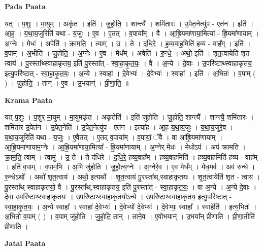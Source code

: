 \documentclass[17pt]{extarticle}
\begin{document}
\textbf{Pada Paata} \newline

यत् । प॒शुः । मा॒युम् । अकृ॑त । इति॑ । जु॒हो॒ति॒ । शान्त्यै᳚ । शमि॑तारः । उ॒पेत॒नेत्यु॑प - एत॑न । इति॑ । आ॒ह॒ । य॒था॒य॒जुरिति॑ यथा - य॒जुः । ए॒व । ए॒तत् । व॒पाया᳚म् । वै । आ॒ह्रि॒यमा॑णाया॒मित्या᳚ - ह्रि॒यमा॑णायाम् । अ॒ग्नेः । मेधः॑ । अपेति॑ । क्रा॒म॒ति॒ । त्वाम् । उ॒ । ते । द॒धि॒रे॒ । ह॒व्य॒वाह॒मिति॑ हव्य - वाह᳚म् । इति॑ । व॒पाम् । अ॒भीति॑ । जु॒हो॒ति॒ । अ॒ग्नेः । ए॒व । मेध᳚म् । अवेति॑ । रु॒न्धे॒ । अथो॒ इति॑ । शृ॒त॒त्वायेति॑ शृत - त्वाय॑ । पु॒रस्ता᳚थ्स्वाहाकृतय॒ इति॑ पु॒रस्ता᳚त् - स्वा॒हा॒कृ॒त॒यः॒ । वै । अ॒न्ये । दे॒वाः । उ॒परि॑ष्टाथ्स्वाहाकृतय॒ इत्यु॒परि॑ष्टात् - स्वा॒हा॒कृ॒त॒यः॒ । अ॒न्ये । स्वाहा᳚ । दे॒वेभ्यः॑ । दे॒वेभ्यः॑ । स्वाहा᳚ । इति॑ । अ॒भितः॑ । व॒पाम् ( ) । जु॒हो॒ति॒ । तान् । ए॒व । उ॒भयान्॑ । प्री॒णा॒ति॒ ॥  \newline


\textbf{Krama Paata} \newline

यत् प॒शुः । प॒शुर् मा॒युम् । मा॒युमकृ॑त । अकृ॒तेति॑ । इति॑ जुहोति । जु॒हो॒ति॒ शान्त्यै᳚ । शान्त्यै॒ शमि॑तारः । शमि॑तार उ॒पेत॑न । उ॒पेत॒नेति॑ । उ॒पेत॒नेत्यु॑प - एत॑न । इत्या॑ह । आ॒ह॒ य॒था॒य॒जुः । य॒था॒य॒जुरे॒व । य॒था॒य॒जुरिति॑ यथा - य॒जुः । ए॒वैतत् । ए॒तद् व॒पाया᳚म् । व॒पायां॒ ॅवै । वा आ᳚ह्रि॒यमा॑णायाम् । आ॒ह्रि॒यमा॑णायाम॒ग्नेः । आ॒ह्रि॒यमा॑णाया॒मित्या᳚ - ह्रि॒यमा॑णायाम् । अ॒ग्नेर् मेधः॑ । मेधोऽप॑ । अप॑ क्रामति । क्रा॒म॒ति॒ त्वाम् । त्वामु॑ । उ॒ ते । ते द॑धिरे । द॒धि॒रे॒ ह॒व्य॒वाह᳚म् । ह॒व्य॒वाह॒मिति॑ । ह॒व्य॒वाह॒मिति॑ हव्य - वाह᳚म् । इति॑ व॒पाम् । व॒पाम॒भि । अ॒भि जु॑होति । जु॒हो॒त्य॒ग्नेः । अ॒ग्नेरे॒व । ए॒व मेध᳚म् । मेध॒मव॑ । अव॑ रुन्धे । रु॒न्धेऽथो᳚ । अथो॑ शृत॒त्वाय॑ । अथो॒ इत्यथो᳚ । शृ॒त॒त्वाय॑ पु॒रस्ता᳚थ्,स्वाहाकृतयः । शृ॒त॒त्वायेति॑ शृत - त्वाय॑ । पु॒रस्ता᳚थ् स्वाहाकृतयो॒ वै । पु॒रस्ता᳚थ्,स्वाहाकृतय॒ इति॑ पु॒रस्ता᳚त् - स्वा॒हा॒कृ॒त॒यः॒ । वा अ॒न्ये । अ॒न्ये दे॒वाः । दे॒वा उ॒परि॑ष्टाथ्स्वाहाकृतयः । उ॒परि॑ष्टाथ्स्वाहाकृतयो॒ऽन्ये । उ॒परि॑ष्टाथ्स्वाहाकृतय॒ इत्यु॒परि॑ष्टात् - स्वा॒हा॒कृ॒त॒यः॒ । अ॒न्ये स्वाहा᳚ । स्वाहा॑ दे॒वेभ्यः॑ । दे॒वेभ्यो॑ दे॒वेभ्यः॑ । दे॒वेभ्यः॒ स्वाहा᳚ । स्वाहेति॑ । इत्य॒भितः॑ । अ॒भितो॑ व॒पाम् ( ) । व॒पाम् जु॑होति । जु॒हो॒ति॒ तान् । ताने॒व । ए॒वोभयान्॑ । उ॒भया᳚न् प्रीणाति । प्री॒णा॒तीति॑ प्रीणाति । \newline

\textbf{Jatai Paata} \newline
\end{document}
